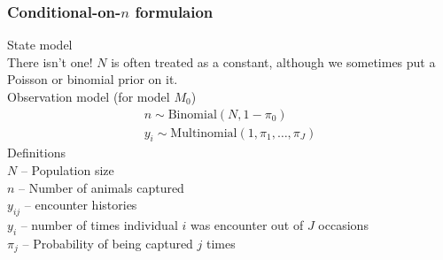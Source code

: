\documentclass[color=usenames,dvipsnames]{beamer}\usepackage[]{graphicx}\usepackage[]{color}
\begin{document}
\begin{frame}
  \frametitle{Conditional-on-$n$ formulaion}
  \small
  State model \\
  \vspace{6pt}
  {\centering
    There isn't one! $N$ is often treated as a constant, although we
    sometimes put a Poisson or binomial prior on it.  \\
  }
  \pause
  \vfill
  Observation model (for model $M_0$)
  \begin{gather*}
    n \sim \mathrm{Binomial}\left(N, 1-\pi_0\right) \\
    y_i \sim \mathrm{Multinomial}(1, \pi_1, \dots, \pi_J)
  \end{gather*}
  \pause
  \small
  Definitions \\
  $N$ -- Population size \\
  $n$ -- Number of animals captured \\
  $y_{ij}$ -- encounter histories \\
  $y_i$ -- number of times individual $i$ was encounter out of $J$
  occasions \\
  $\pi_j$ -- Probability of being captured $j$ times
\end{frame}
\end{document}
